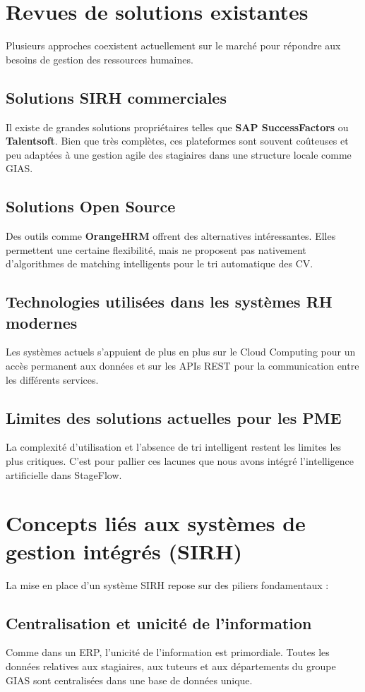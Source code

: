 \section{Revues de solutions existantes}
Plusieurs approches coexistent actuellement sur le marché pour répondre aux besoins de gestion des ressources humaines.

\subsection{Solutions SIRH commerciales}
Il existe de grandes solutions propriétaires telles que \textbf{SAP SuccessFactors} ou \textbf{Talentsoft}. Bien que très complètes, ces plateformes sont souvent coûteuses et peu adaptées à une gestion agile des stagiaires dans une structure locale comme GIAS.

\subsection{Solutions Open Source}
Des outils comme \textbf{OrangeHRM} offrent des alternatives intéressantes. Elles permettent une certaine flexibilité, mais ne proposent pas nativement d'algorithmes de matching intelligents pour le tri automatique des CV.

\subsection{Technologies utilisées dans les systèmes RH modernes}
Les systèmes actuels s'appuient de plus en plus sur le Cloud Computing pour un accès permanent aux données et sur les APIs REST pour la communication entre les différents services.

\subsection{Limites des solutions actuelles pour les PME}
La complexité d'utilisation et l'absence de tri intelligent restent les limites les plus critiques. C'est pour pallier ces lacunes que nous avons intégré l'intelligence artificielle dans StageFlow.

\section{Concepts liés aux systèmes de gestion intégrés (SIRH)}
La mise en place d'un système SIRH repose sur des piliers fondamentaux :

\subsection{Centralisation et unicité de l'information}
Comme dans un ERP, l'unicité de l'information est primordiale. Toutes les données relatives aux stagiaires, aux tuteurs et aux départements du groupe GIAS sont centralisées dans une base de données unique.

